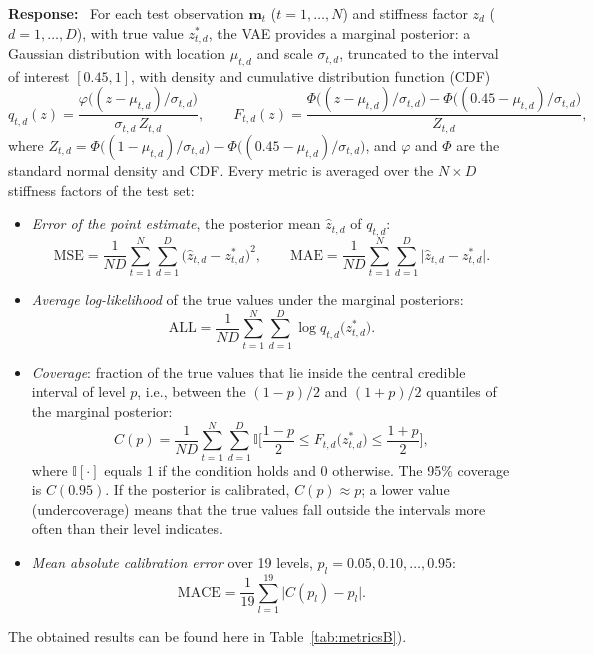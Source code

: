 \documentclass[11pt]{article}
\newenvironment{response}{\par\smallskip\noindent\color{resp}\textbf{Response:}\ }{\par}
\newcommand{\m}{\mathbf{m}}
\begin{document}
\begin{response}
	For each test observation $\m_t$ ($t=1,\dots,N$) and stiffness factor $z_d$ ($d=1,\dots,D$), with true value
	$z^*_{t,d}$, the VAE provides a marginal posterior: a Gaussian distribution with location $\mu_{t,d}$ and scale
	$\sigma_{t,d}$, truncated to the interval of interest $[0.45,1]$, with density and cumulative distribution function (CDF)
	\begin{equation}
		q_{t,d}(z)=\frac{\varphi\big((z-\mu_{t,d})/\sigma_{t,d}\big)}{\sigma_{t,d}\,Z_{t,d}},\qquad
		F_{t,d}(z)=\frac{\Phi\big((z-\mu_{t,d})/\sigma_{t,d}\big)-\Phi\big((0.45-\mu_{t,d})/\sigma_{t,d}\big)}{Z_{t,d}},
		\label{eq:marginal_tn}
	\end{equation}
	where $Z_{t,d}=\Phi\big((1-\mu_{t,d})/\sigma_{t,d}\big)-\Phi\big((0.45-\mu_{t,d})/\sigma_{t,d}\big)$, and $\varphi$ and
	$\Phi$ are the standard normal density and CDF. Every metric is averaged over the $N\times D$ stiffness factors of the
	test set:
	\begin{itemize}[leftmargin=*]
		\item \emph{Error of the point estimate}, the posterior mean $\hat z_{t,d}$ of $q_{t,d}$:
		\begin{equation}
			\mathrm{MSE}=\frac{1}{ND}\sum_{t=1}^{N}\sum_{d=1}^{D}\big(\hat z_{t,d}-z^*_{t,d}\big)^2,\qquad
			\mathrm{MAE}=\frac{1}{ND}\sum_{t=1}^{N}\sum_{d=1}^{D}\big|\hat z_{t,d}-z^*_{t,d}\big|.
			\label{eq:mse_mae}
		\end{equation}
		\item \emph{Average log-likelihood} of the true values under the marginal posteriors:
		\begin{equation}
			\mathrm{ALL}=\frac{1}{ND}\sum_{t=1}^{N}\sum_{d=1}^{D}\log q_{t,d}\big(z^*_{t,d}\big).
			\label{eq:all}
		\end{equation}
		\item \emph{Coverage}: fraction of the true values that lie inside the central credible interval of level $p$, i.e.,
		between the $(1-p)/2$ and $(1+p)/2$ quantiles of the marginal posterior:
		\begin{equation}
			C(p)=\frac{1}{ND}\sum_{t=1}^{N}\sum_{d=1}^{D}\mathbb{I}\Big[\frac{1-p}{2}\le F_{t,d}\big(z^*_{t,d}\big)\le\frac{1+p}{2}\Big],
			\label{eq:coverage}
		\end{equation}
		where $\mathbb{I}[\cdot]$ equals 1 if the condition holds and 0 otherwise. The 95\% coverage is $C(0.95)$. If the
		posterior is calibrated, $C(p)\approx p$; a lower value (undercoverage) means that the true values fall outside the
		intervals more often than their level indicates.
		\item \emph{Mean absolute calibration error} over 19 levels, $p_l=0.05,0.10,\dots,0.95$:
		\begin{equation}
			\mathrm{MACE}=\frac{1}{19}\sum_{l=1}^{19}\big|C(p_l)-p_l\big|.
			\label{eq:mace}
		\end{equation}
	\end{itemize}
	The obtained results can be found here in Table~\ref{tab:metricsB}).
	

\end{response}
\end{document}
